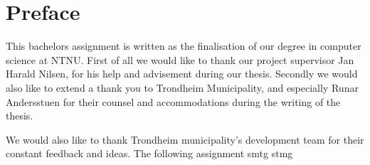 \chapter*{Preface} %
\label{chap:preface}


This bachelors assignment is written as the finalisation of our degree in computer science at NTNU. First of all we would like to thank our project supervisor Jan Harald Nilsen, for his help and advisement during our thesis. Secondly we would also like to extend a thank you to Trondheim Municipality, and especially Runar Andersstuen for their counsel and accommodations during the writing of the thesis. 

We would also like to thank Trondheim municipality's development team for their constant feedback and ideas.
The following assignment smtg stmg